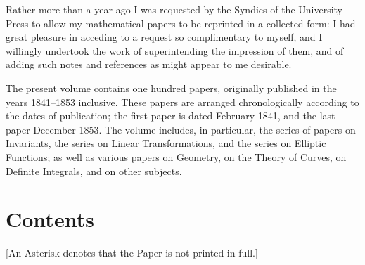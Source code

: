\documentclass[11pt,a4paper]{book}
\begin{document}
Rather more than a year ago I was requested by the Syndics of the University Press to allow my mathematical papers to be reprinted in a collected form: I had great pleasure in acceding to a request so complimentary to myself, and I willingly undertook the work of superintending the impression of them, and of adding such notes and references as might appear to me desirable.

The present volume contains one hundred papers, originally published in the years 1841--1853 inclusive. These papers are arranged chronologically according to the dates of publication; the first paper is dated February 1841, and the last paper December 1853. The volume includes, in particular, the series of papers on Invariants, the series on Linear Transformations, and the series on Elliptic Functions; as well as various papers on Geometry, on the Theory of Curves, on Definite Integrals, and on other subjects.

\cleardoublepage

\chapter*{Contents}

{\small [An Asterisk denotes that the Paper is not printed in full.]}
\end{document}
